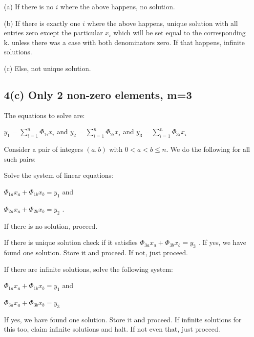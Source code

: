 \documentclass[fleqn, 11pt]{article}
\begin{document}
\smallskip

(a) If there is no $i$ where the above happens, no solution.

(b) If there is exactly one $i$ where the above happens, unique solution with 
all entries zero except the particular $x_i$ which will be set equal to the
corresponding k.
unless
there was a case with both denominators zero. If that happens, 
infinite solutions.

(c) Else, not unique solution.


\newpage

\subsection*{4(c) Only 2 non-zero elements, m=3}

The equations to solve are: 

\smallskip
 
 $y_1=\displaystyle \sum_{i=1}^{n} \Phi_{1i} x_i$ \hspace{10pt} and 
 \hspace{10pt} $y_2=\displaystyle \sum_{i=1}^{n} \Phi_{2i} x_i$ 
 \hspace{10pt} and 
 \hspace{10pt} $y_3=\displaystyle \sum_{i=1}^{n} \Phi_{3i} x_i$ 
 
 
 Consider a pair of integers $(a,b)$ with $0<a<b \leq n$. 
 We do the following for all such pairs: 
 
 Solve the system of linear equations: 
 
 $\Phi_{1a} x_a +\Phi_{1b} x_b = y_1 $   and 
 
 $\Phi_{2a} x_a +\Phi_{2b} x_b = y_2 $ . 
 
 If there is no solution, proceed. 
 
 If there is unique solution check if it satisfies $\Phi_{3a} x_a +\Phi_{3b} x_b = y_3 $ . If yes, we have found one solution. Store it and proceed. If not, just proceed. 
 
 If there are infinite solutions, solve the following system: 
 
 
 $\Phi_{1a} x_a +\Phi_{1b} x_b = y_1 $   and 
 
 $\Phi_{3a} x_a +\Phi_{3b} x_b = y_3 $ 
 
 If yes, we have found one solution. Store it and proceed. 
 If infinite solutions for this too, claim infinite solutions and halt.
 If not even that, just proceed. 
 
 \medskip
 
\end{document}
